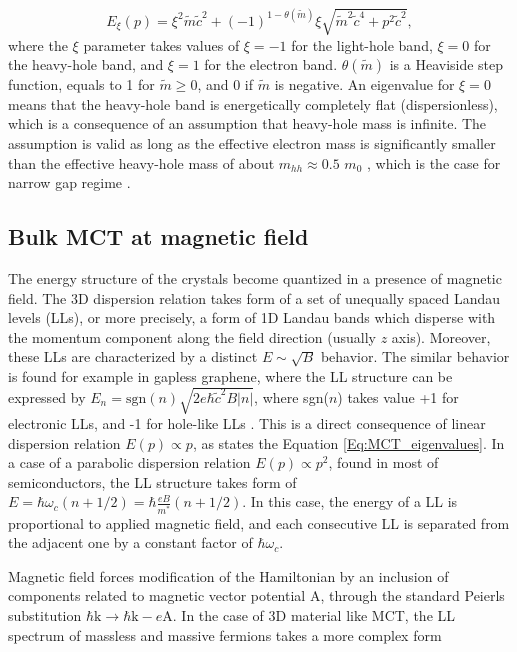 \documentclass[titlepage,a4paper]{book}
\begin{document}
\begin{equation}
\label{Eq:MCT_eigenvalues}
E_\xi (p) = \xi^2 \tilde{m}\tilde{c}^2 + (-1)^{1-\theta (\tilde{m})} \xi \sqrt{\tilde{m}^2\tilde{c}^4 + p^2\tilde{c}^2},
\end{equation}
where the $\xi$ parameter takes values of $\xi = -1$ for the light-hole band, $\xi = 0$ for the heavy-hole band, and $\xi = 1$ for the electron band. $\theta(\tilde{m})$ is a Heaviside step function, equals to 1 for $\tilde{m} \geq 0$, and 0 if $\tilde{m}$ is negative. An eigenvalue for $\xi = 0$ means that the heavy-hole band is energetically completely flat (dispersionless), which is a consequence of an assumption that heavy-hole mass is infinite. The assumption is valid as long as the effective electron mass is significantly smaller than the effective heavy-hole mass of about $m_{hh} \approx 0.5$ $m_0$ \cite{Weiler_MCT}, which is the case for narrow gap regime \cite{Orlita_MCT}.

\subsection{Bulk MCT at magnetic field}
The energy structure of the crystals become quantized in a presence of magnetic field. The 3D dispersion relation takes form of a set of unequally spaced Landau levels (LLs), or more precisely, a form of 1D Landau bands which disperse with the momentum component along the field direction (usually $z$ axis). Moreover, these LLs are characterized by a distinct $E \sim \sqrt{B}$ behavior. The similar behavior is found for example in gapless graphene, where the LL structure can be expressed by $E_n = \mathrm{sgn}(n) \sqrt{2e\hbar \tilde{c}^2B|n|}$, where sgn($n$) takes value +1 for electronic LLs, and -1 for hole-like LLs \cite{Jiang_MCT}. This is a direct consequence of linear dispersion relation $E(p) \propto p$, as states the Equation \ref{Eq:MCT_eigenvalues}. In a case of a parabolic dispersion relation $E(p) \propto p^2$, found in most of semiconductors, the LL structure takes form of $E = \hbar \omega_c(n + 1/2) = \hbar \frac{eB}{m^*}(n + 1/2)$. In this case, the energy of a LL is proportional to applied magnetic field, and each consecutive LL is separated from the adjacent one by a constant factor of $\hbar \omega_c$. 

Magnetic field forces modification of the Hamiltonian by an inclusion of components related to magnetic vector potential $\boldsymbol{\mathrm{A}}$, through the standard Peierls substitution $\hbar \boldsymbol{\mathrm{k}} \rightarrow \hbar\boldsymbol{\mathrm{k}} - e \boldsymbol{\mathrm{A}}$. In the case of 3D material like MCT, the LL spectrum of massless and massive fermions takes a more complex form
\end{document}
